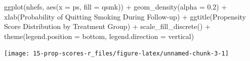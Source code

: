 \documentclass[
  10pt,
]{book}
\newenvironment{Shaded}{\begin{snugshade}}{\end{snugshade}}
\newcommand{\AttributeTok}[1]{\textcolor[rgb]{0.77,0.63,0.00}{#1}}
\newcommand{\FloatTok}[1]{\textcolor[rgb]{0.00,0.00,0.81}{#1}}
\newcommand{\FunctionTok}[1]{\textcolor[rgb]{0.00,0.00,0.00}{#1}}
\newcommand{\NormalTok}[1]{#1}
\newcommand{\SpecialCharTok}[1]{\textcolor[rgb]{0.00,0.00,0.00}{#1}}
\newcommand{\StringTok}[1]{\textcolor[rgb]{0.31,0.60,0.02}{#1}}
\begin{document}
\begin{Shaded}
\begin{Highlighting}[]
\FunctionTok{ggplot}\NormalTok{(nhefs, }\FunctionTok{aes}\NormalTok{(}\AttributeTok{x =}\NormalTok{ ps, }\AttributeTok{fill =}\NormalTok{ qsmk)) }\SpecialCharTok{+} \FunctionTok{geom\_density}\NormalTok{(}\AttributeTok{alpha =} \FloatTok{0.2}\NormalTok{) }\SpecialCharTok{+}
  \FunctionTok{xlab}\NormalTok{(}\StringTok{\textquotesingle{}Probability of Quitting Smoking During Follow{-}up\textquotesingle{}}\NormalTok{) }\SpecialCharTok{+}
  \FunctionTok{ggtitle}\NormalTok{(}\StringTok{\textquotesingle{}Propensity Score Distribution by Treatment Group\textquotesingle{}}\NormalTok{) }\SpecialCharTok{+}
  \FunctionTok{scale\_fill\_discrete}\NormalTok{(}\StringTok{\textquotesingle{}\textquotesingle{}}\NormalTok{) }\SpecialCharTok{+}
  \FunctionTok{theme}\NormalTok{(}\AttributeTok{legend.position =} \StringTok{\textquotesingle{}bottom\textquotesingle{}}\NormalTok{, }\AttributeTok{legend.direction =} \StringTok{\textquotesingle{}vertical\textquotesingle{}}\NormalTok{)}
\end{Highlighting}
\end{Shaded}

\begin{center}\texttt{[image: 15-prop-scores-r\_files/figure-latex/unnamed-chunk-3-1]} \end{center}
\end{document}
